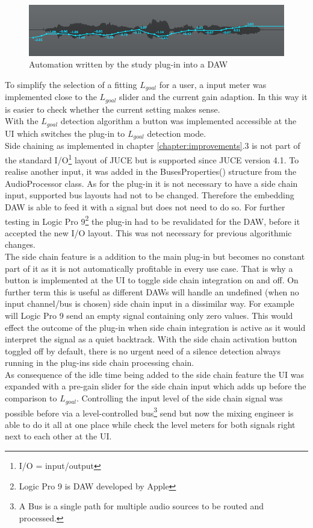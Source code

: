 \begin{figure}[H]
\includegraphics[width=\textwidth]{images/automation}
\caption{Automation written by the study plug-in into a DAW}
\label{auto}
\end{figure}

To simplify the selection of a fitting $L_{goal}$ for a user, a input meter was implemented close to the $L_{goal}$ slider and the current gain adaption. In this way it is easier to check whether the current setting makes sense.\\
With the $L_{goal}$ detection algorithm a button was implemented accessible at the UI which switches the plug-in to $L_{goal}$ detection mode.\\
Side chaining as implemented in chapter \ref{chapter:improvements}.3 is not part of the standard I/O\footnote{I/O = input/output} layout of JUCE but is supported since JUCE version 4.1. To realise another input, it was added in the BusesProperties() structure from the AudioProcessor class. As for the plug-in it is not necessary to have a side chain input, supported bus layouts had not to be changed. Therefore the embedding DAW is able to feed it with a signal but does not need to do so. For further testing in Logic Pro 9\footnote{Logic Pro 9 is DAW developed by Apple} the plug-in had to be revalidated for the DAW, before it accepted the new I/O layout. This was not necessary for previous algorithmic changes.\\
The side chain feature is a addition to the main plug-in but becomes no constant part of it as it is not automatically profitable in every use case. That is why a button is implemented at the UI to toggle side chain integration on and off. On further term this is useful as different DAWs will handle an undefined (when no input channel/bus is chosen) side chain input in a dissimilar way. For example will Logic Pro 9 send an empty signal containing only zero values. This would effect the outcome of the plug-in when side chain integration is active as it would interpret the signal as a quiet backtrack. With the side chain activation button toggled off by default, there is no urgent need of a silence detection always running in the plug-ins side chain processing chain.\\
As consequence of the idle time being added to the side chain feature the UI was expanded with a pre-gain slider for the side chain input which adds up before the comparison to $L_{goal}$. Controlling the input level of the side chain signal was possible before via a level-controlled bus\footnote{A Bus is a single path for multiple audio sources to be routed and processed.} send but now the mixing engineer is able to do it all at one place while check the level meters for both signals right next to each other at the UI. 

